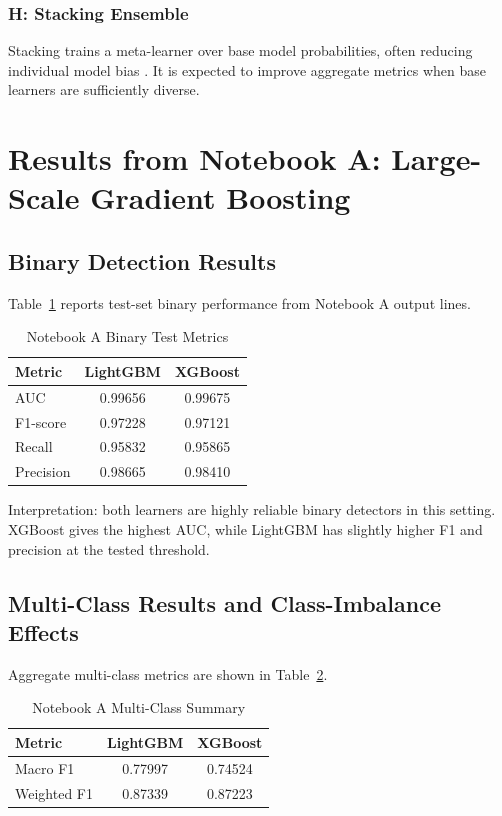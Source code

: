 \documentclass[10pt,journal]{IEEEtran}
\begin{document}
\subsubsection{H: Stacking Ensemble}
Stacking trains a meta-learner over base model probabilities, often reducing individual model bias \cite{wolpert1992stacked}. It is expected to improve aggregate metrics when base learners are sufficiently diverse.

\section{Results from Notebook A: Large-Scale Gradient Boosting}
\subsection{Binary Detection Results}
Table~\ref{tab:gb_binary} reports test-set binary performance from Notebook A output lines.

\begin{table}[!t]
\caption{Notebook A Binary Test Metrics}
\label{tab:gb_binary}
\centering
\begin{tabular}{lcc}
\toprule
Metric & LightGBM & XGBoost \\
\midrule
AUC & 0.99656 & 0.99675 \\
F1-score & 0.97228 & 0.97121 \\
Recall & 0.95832 & 0.95865 \\
Precision & 0.98665 & 0.98410 \\
\bottomrule
\end{tabular}
\end{table}

Interpretation: both learners are highly reliable binary detectors in this setting. XGBoost gives the highest AUC, while LightGBM has slightly higher F1 and precision at the tested threshold.

\subsection{Multi-Class Results and Class-Imbalance Effects}
Aggregate multi-class metrics are shown in Table~\ref{tab:gb_multi}.

\begin{table}[!t]
\caption{Notebook A Multi-Class Summary}
\label{tab:gb_multi}
\centering
\begin{tabular}{lcc}
\toprule
Metric & LightGBM & XGBoost \\
\midrule
Macro F1 & 0.77997 & 0.74524 \\
Weighted F1 & 0.87339 & 0.87223 \\
\bottomrule
\end{tabular}
\end{table}
\end{document}

